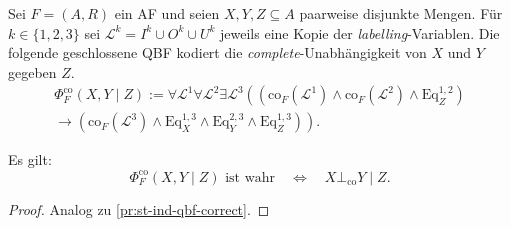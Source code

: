 \begin{Definition}
    \label{def:co-ind-qbf}
    Sei \(F=(A,R)\) ein AF und seien \(X,Y,Z\subseteq A\) paarweise disjunkte Mengen.
    Für \(k \in \{1,2,3\}\) sei \(\mathcal{L}^k = I^k \cup O^k \cup U^k\) jeweils eine Kopie der \textit{labelling}-Variablen. 
    Die folgende geschlossene QBF kodiert die \textit{complete}-Unabhängigkeit von \(X\) und \(Y\) gegeben \(Z\). 
    \begin{multline*}
    \Phi^{\mathrm{co}}_F(X,Y \mid Z)
    :=
    \forall \mathcal{L}^1 
    \forall \mathcal{L}^2
    \exists \mathcal{L}^3
    \left(
        \left(
            \mathrm{co}_F(\mathcal{L}^1)
            \land
            \mathrm{co}_F(\mathcal{L}^2)
            \land
            \mathrm{Eq}^{1,2}_Z
        \right)
        \right. \\
        \left.
        \rightarrow
        \left(
            \mathrm{co}_F(\mathcal{L}^3)
            \land
            \mathrm{Eq}^{1,3}_X
            \land
            \mathrm{Eq}^{2,3}_Y
            \land
            \mathrm{Eq}^{1,3}_Z
        \right)
    \right).
    \end{multline*}
\end{Definition}

\begin{Proposition}
    \label{prop:co-ind-qbf-correct}
    Es gilt:
    \[
        \Phi^{\mathrm{co}}_F(X,Y \mid Z)\text{ ist wahr}
        \quad\Longleftrightarrow\quad
        X \bot_{\mathrm{co}} Y \mid Z.
    \]
\end{Proposition}

\begin{proof}
    \label{pr:co-ind-qbf-correct}
    Analog zu \ref{pr:st-ind-qbf-correct}.
\end{proof}

